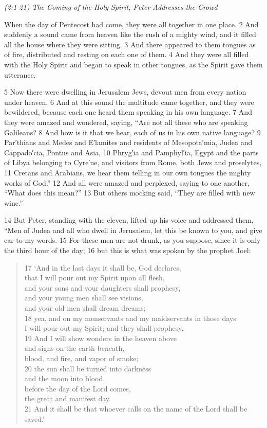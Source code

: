 \documentclass[letterpaper]{report}
\begin{document}
{\centering
	\emph{(2:1-21) The Coming of the Holy Spirit,
		Peter Addresses the Crowd}\\
}
\begin{multicols}{2}
When the day of Pentecost had come, they were all together in one place. 2 And suddenly a sound came from heaven like the rush of a mighty wind, and it filled all the house where they were sitting. 3 And there appeared to them tongues as of fire, distributed and resting on each one of them. 4 And they were all filled with the Holy Spirit and began to speak in other tongues, as the Spirit gave them utterance.

5 Now there were dwelling in Jerusalem Jews, devout men from every nation under heaven. 6 And at this sound the multitude came together, and they were bewildered, because each one heard them speaking in his own language. 7 And they were amazed and wondered, saying, “Are not all these who are speaking Galileans? 8 And how is it that we hear, each of us in his own native language? 9 Par′thians and Medes and E′lamites and residents of Mesopota′mia, Judea and Cappado′cia, Pontus and Asia, 10 Phryg′ia and Pamphyl′ia, Egypt and the parts of Libya belonging to Cyre′ne, and visitors from Rome, both Jews and proselytes, 11 Cretans and Arabians, we hear them telling in our own tongues the mighty works of God.” 12 And all were amazed and perplexed, saying to one another, “What does this mean?” 13 But others mocking said, “They are filled with new wine.”

14 But Peter, standing with the eleven, lifted up his voice and addressed them, “Men of Judea and all who dwell in Jerusalem, let this be known to you, and give ear to my words. 15 For these men are not drunk, as you suppose, since it is only the third hour of the day; 16 but this is what was spoken by the prophet Joel:
\begin{verse}
17 ‘And in the last days it shall be, God declares,\\
that I will pour out my Spirit upon all flesh,\\
and your sons and your daughters shall prophesy,\\
and your young men shall see visions,\\
and your old men shall dream dreams;\\
18 yea, and on my menservants and my maidservants in those days\\
I will pour out my Spirit; and they shall prophesy.\\
19 And I will show wonders in the heaven above\\
and signs on the earth beneath,\\
blood, and fire, and vapor of smoke;\\
20 the sun shall be turned into darkness\\
and the moon into blood,\\
before the day of the Lord comes,\\
the great and manifest day.\\
21 And it shall be that whoever calls on the name of the Lord shall be saved.’\\
\end{verse}
\end{multicols}
\end{document}
